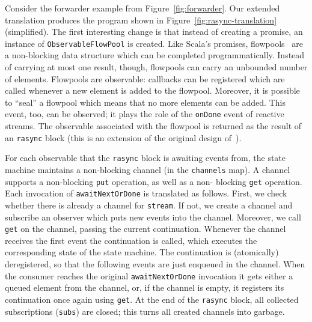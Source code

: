 \documentclass{acm_proc_article-sp}
\begin{document}
Consider the forwarder example from Figure~\ref{fig:forwarder}. Our extended
translation produces the program shown in Figure~\ref{fig:rasync-translation}
(simplified). The first interesting change is that instead of creating a
promise, an instance of \verb|ObservableFlowPool| is created. Like Scala's
promises, flowpools~\cite{ProkopecMSHO12} are a non-blocking data structure
which can be completed programmatically. Instead of carrying at most one
result, though, flowpools can carry an unbounded number of elements. Flowpools
are observable: callbacks can be registered which are called whenever a new
element is added to the flowpool. Moreover, it is possible to ``seal'' a
flowpool which means that no more elements can be added. This event, too, can
be observed; it plays the role of the \verb|onDone| event of reactive streams.
The observable associated with the flowpool is returned as the result of an
\verb|rasync| block (this is an extension of the original design
of~\cite{ProkopecMSHO12}).

For each observable that the \verb|rasync| block is awaiting events from, the
state machine maintains a non-blocking channel (in the \verb|channels| map). A
channel supports a non-blocking \verb|put| operation, as well as a non-
blocking \verb|get| operation. Each invocation of \verb|awaitNextOrDone| is
translated as follows. First, we check whether there is already a channel for
\verb|stream|. If not, we create a channel and subscribe an observer which puts
new events into the channel. Moreover, we call \verb|get| on the channel,
passing the current continuation. Whenever the channel receives the first
event the continuation is called, which executes the corresponding state of
the state machine. The continuation is (atomically) deregistered, so
that the following events are just enqueued in the channel. When the consumer
reaches the original \verb|awaitNextOrDone| invocation it gets either a queued
element from the channel, or, if the channel is empty, it registers its
continuation once again using \verb|get|. At the end of the \verb|rasync|
block, all collected subscriptions (\verb|subs|) are closed; this turns all
created channels into garbage.
\end{document}
